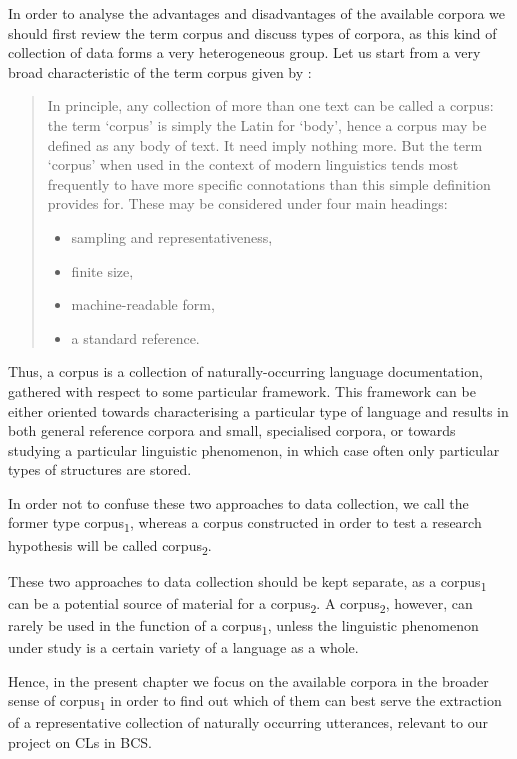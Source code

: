 In order to analyse the advantages and disadvantages of the available corpora we should first review the term corpus and discuss types of corpora, as this kind of collection of data forms a very heterogeneous group. Let us start from a very broad characteristic of the term corpus given by \citet[21]{McEneryWilson96}:
\begin{quotation} In principle, any collection of more than one text can be called a corpus: the term `corpus' is simply the Latin for `body', hence a corpus may be defined as any body of text. It need imply nothing more. But the term `corpus' when used in the context of modern linguistics tends most frequently to have more specific connotations than this simple definition provides for. These may be considered under four main headings:
	\begin{itemize}
		\item sampling and representativeness,
 \item finite size,
 \item machine-readable form,
 \item a standard reference.
 	\end{itemize}
\end{quotation}

Thus, a corpus is a collection of naturally-occurring language documentation, gathered with respect to some particular framework. This framework can be either oriented towards characterising a particular type of language \citet[171]{Sinclair91} and results in both general reference corpora and small, specialised corpora, or towards studying a particular linguistic phenomenon, in which case often only particular types of structures are stored. 

In order not to confuse these two approaches to data collection, we call the former type corpus\textsubscript{1}, whereas a corpus constructed in order to test a research hypothesis will be called corpus\textsubscript{2}.

These two approaches to data collection should be kept separate, as a corpus\textsubscript{1} can be a potential source of material for a corpus\textsubscript{2}. A corpus\textsubscript{2}, however, can rarely be used in the function of a corpus\textsubscript{1}, unless the linguistic phenomenon under study is a certain variety of a language as a whole.

	Hence, in the present chapter we focus on the available corpora in the broader sense of corpus\textsubscript{1} in order to find out which of them can best serve the extraction of a representative collection of naturally occurring utterances, relevant to our project on CLs in BCS.

